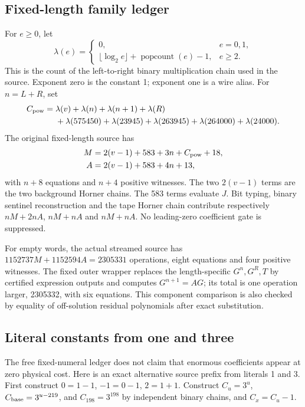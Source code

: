 \documentclass[11pt,letterpaper]{article}
\theoremstyle{definition}\newtheorem{definition}[theorem]{Definition}
\theoremstyle{remark}\newtheorem{remark}[theorem]{Remark}
\newcommand{\pop}{\operatorname{popcount}}
\begin{document}
\subsection{Fixed-length family ledger}
For $e\ge0$, let
\[
 \lambda(e)=\begin{cases}0,&e=0,1,\\
 \lfloor\log_2e\rfloor+\pop(e)-1,&e\ge2.
 \end{cases}
\]
This is the count of the left-to-right binary multiplication chain used in the source. Exponent zero is the constant 1; exponent one is a wire alias. For $n=L+R$, set
\begin{align*}
 C_{\rm pow}={}&\lambda(v)+\lambda(n)+\lambda(n+1)+\lambda(R)\\
 &+\lambda(575450)+\lambda(23945)+\lambda(263945)
  +\lambda(264000)+\lambda(24000).
\end{align*}
The original fixed-length source has
\begin{align}
 M&=2(v-1)+583+3n+C_{\rm pow}+18,\label{ptr:ai:eq:fixedledger}\\
 A&=2(v-1)+583+4n+13,
\end{align}
with $n+8$ equations and $n+4$ positive witnesses. The two $2(v-1)$ terms are the two background Horner chains. The 583 terms evaluate $J$. Bit typing, binary sentinel reconstruction and the tape Horner chain contribute respectively $nM+2nA$, $nM+nA$ and $nM+nA$. No leading-zero coefficient gate is suppressed.

For empty words, the actual streamed source has $1152737M+1152594A=2305331$ operations, eight equations and four positive witnesses. The fixed outer wrapper replaces the length-specific $G^n,G^R,T$ by certified expression outputs and computes $G^{n+1}=AG$; its total is one operation larger, 2305332, with six equations. This component comparison is also checked by equality of off-solution residual polynomials after exact substitution.

\subsection{Literal constants from one and three}\label{ptr:ai:sec:strict}
The free fixed-numeral ledger does not claim that enormous coefficients appear at zero physical cost. Here is an exact alternative source prefix from literals 1 and 3. First construct $0=1-1$, $-1=0-1$, $2=1+1$. Construct $C_u=3^u$, $C_{\rm base}=3^{u-219}$, and $C_{198}=3^{198}$ by independent binary chains, and $C_x=C_u-1$.
\end{document}

